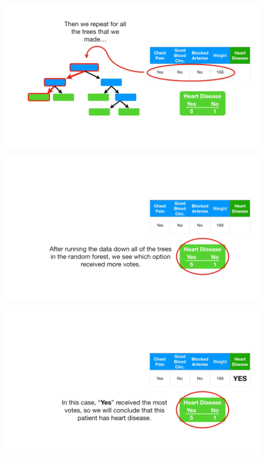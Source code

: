 \documentclass[
  ignorenonframetext,
]{beamer}
\begin{document}
\begin{frame}{}
\protect\hypertarget{section-59}{}
\includegraphics{images/r60.png}
\end{frame}

\begin{frame}{}
\protect\hypertarget{section-60}{}
\includegraphics{images/r61.png}
\end{frame}

\begin{frame}{}
\protect\hypertarget{section-61}{}
\includegraphics{images/r62.png}
\end{frame}
\end{document}
